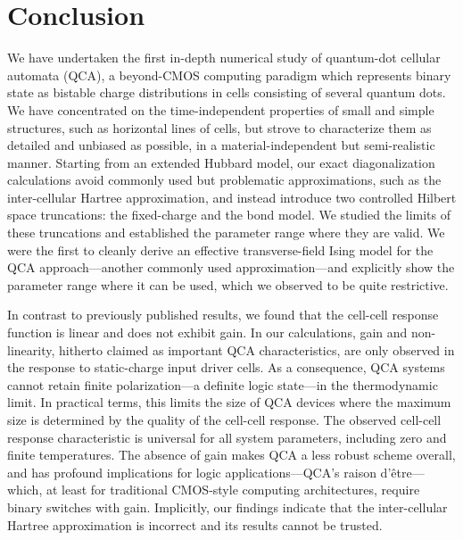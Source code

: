 \chapter{Conclusion}

We have undertaken the first in-depth numerical study of quantum-dot cellular
automata (QCA), a beyond-CMOS computing paradigm which represents binary state
as bistable charge distributions in cells consisting of several quantum dots. We
have concentrated on the time-independent properties of small and simple
structures, such as horizontal lines of cells, but strove to characterize them
as detailed and unbiased as possible, in a material-independent but
semi-realistic manner. Starting from an extended Hubbard model, our exact
diagonalization calculations avoid commonly used but problematic approximations,
such as the inter-cellular Hartree approximation, and instead introduce two
controlled Hilbert space truncations: the fixed-charge and the bond model. We
studied the limits of these truncations and established the parameter range
where they are valid. We were the first to cleanly derive an effective
transverse-field Ising model for the QCA approach---another commonly used
approximation---and explicitly show the parameter range where it can be used,
which we observed to be quite restrictive.

In contrast to previously published results, we found that the cell-cell
response function is linear and does not exhibit gain. In our calculations, gain
and non-linearity, hitherto claimed as important QCA characteristics, are only
observed in the response to static-charge input driver cells. As a consequence,
QCA systems cannot retain finite polarization---a definite logic state---in the
thermodynamic limit. In practical terms, this limits the size of QCA devices
where the maximum size is determined by the quality of the cell-cell response.
The observed cell-cell response characteristic is universal for all system
parameters, including zero and finite temperatures. The absence of gain makes
QCA a less robust scheme overall, and has profound implications for logic
applications---QCA's raison d'\^etre---which, at least for traditional
CMOS-style computing architectures, require binary switches with gain.
Implicitly, our findings indicate that the inter-cellular Hartree approximation
is incorrect and its results cannot be trusted.

